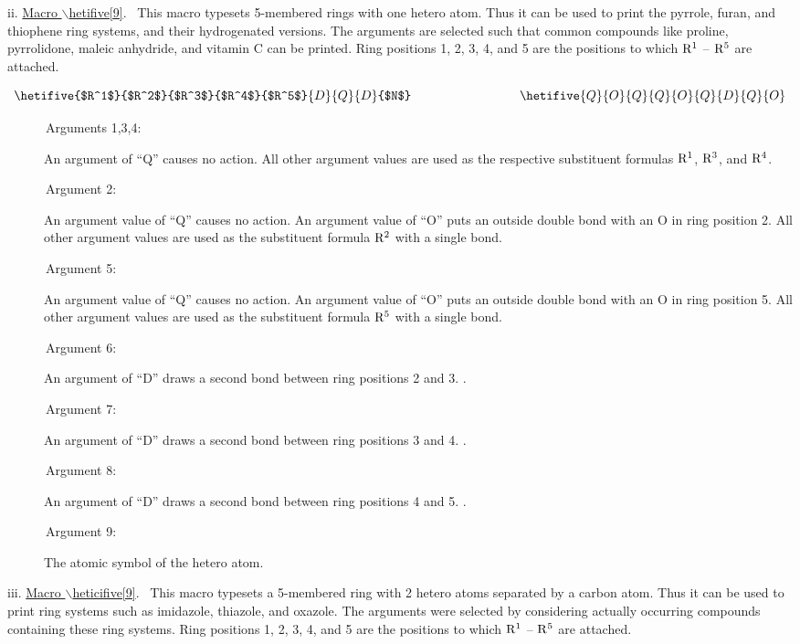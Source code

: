  \vspace{\len mm}
 \indent ii. \underline{Macro $\backslash $hetifive[9]}.
 \ This macro typesets 5-membered rings with one hetero atom.
 Thus it can be used to print the pyrrole, furan, and
 thiophene ring systems, and their hydrogenated versions.
 The arguments are selected such that common compounds like
 proline, pyrrolidone, maleic anhydride, and vitamin C
 can be printed. Ring positions 1, 2, 3, 4, and 5 are the
 positions to which ${\rm R^1}$ -- ${\rm R^5}$ are attached.
 
 \[ \hetifive{$R^1$}{$R^2$}{$R^3$}{$R^4$}{$R^5$}{D}{Q}{D}{$N$}
    \hspace{3cm}
    \hetifive{Q}{O}{Q}{Q}{O}{Q}{D}{Q}{O}  \]
 
 \begin{description}
 \item[{\rm \ \ \ \ \ \ Arguments 1,3,4:}] An argument of ``Q''
      causes no action. All other argument values are used
      as the respective substituent formulas ${\rm R^1}$,
      ${\rm R^3}$, and ${\rm R^4}$. 
 \item[{\rm \ \ \ \ \ \ Argument 2:}] An argument value of ``Q''
      causes no action. An argument value of ``O'' puts an
      outside double bond with an O in ring position 2.
      All other argument values are used as the substituent
      formula ${\rm R^2}$ with a single bond.
 \item[{\rm \ \ \ \ \ \ Argument 5:}] An argument value of ``Q''
      causes no action. An argument value of ``O'' puts an
      outside double bond with an O in ring position 5.
      All other argument values are used as the substituent
      formula ${\rm R^5}$ with a single bond.
 \item[{\rm \ \ \ \ \ \ Argument 6:}] An argument of ``D'' draws
      a second bond between ring positions 2 and 3. \ri .
 \item[{\rm \ \ \ \ \ \ Argument 7:}] An argument of ``D'' draws
      a second bond between ring positions 3 and 4. \ri .
 \item[{\rm \ \ \ \ \ \ Argument 8:}] An argument of ``D'' draws
      a second bond between ring positions 4 and 5. \ri .
 \item[{\rm \ \ \ \ \ \ Argument 9:}] The atomic symbol of the
      hetero atom.
 \end{description}

 \vspace{\len mm}
 \indent iii. \underline{Macro $\backslash $heticifive[9]}.
 \  This macro typesets a 5-membered ring with 2 hetero atoms
 separated by a carbon atom. Thus it can be used to print ring
 systems such as imidazole, thiazole, and oxazole. The arguments
 were selected by considering actually occurring compounds
 containing these ring systems. Ring positions 1, 2, 3, 4, and 5
 are the positions to which ${\rm R^1}$ -- ${\rm R^5}$ are
 attached.
 
